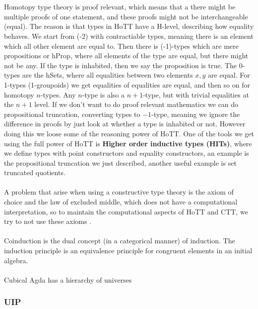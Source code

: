 \documentclass[twoside,11pt,openright]{report}
\theoremstyle{plain} %
\theoremstyle{definition}
\theoremstyle{remark}
\begin{document}
\\ \\
Homotopy type theory is proof relevant, which means that a there might be multiple proofs of one statement, and these proofs might not be interchangeable (equal). The reason is that types in HoTT have a H-level, describing how equality behaves. We start from (-2) with contractiable types, meaning there is an element which all other element are equal to. Then there is (-1)-types which are mere propositions or hProp, where all elements of the type are equal, but there might not be any. If the type is inhabited, then we say the proposition is true. The 0-types are the hSets, where all equalities between two elements \(x,y\) are equal. For 1-types (1-groupoids) we get equalities of equalities are equal, and then so on for homotopy \(n\)-types. Any \(n\)-type is also a \(n+1\)-type, but with trivial equalities at the \(n+1\) level. If we don't want to do proof relevant mathematics we can do propositional truncation, converting types to \(-1\)-type, meaning we ignore the difference in proofs by just look at whether a type is inhabited or not. However doing this we loose some of the reasoning power of HoTT. One of the tools we get using the full power of HoTT is \textbf{Higher order inductive types (HITs)}, where we define types with point constructors and equality constructors, an example is the propositional truncation we just described, another useful example is set truncated quotients.
\\ \\
A problem that arise when using a constructive type theory is the axiom of choice and the law of excluded middle, which does not have a computational interpretation, so to maintain the computational aspects of HoTT and CTT, we try to not use these axioms \cite[Introduction]{hottbook}.
\\ \\
Coinduction is the dual concept (in a categorical manner) of induction. The induction principle is an equivalence principle for congruent elements in an initial algebra.
\\ \\
Cubical Agda has a hierarchy of universes

\subsubsection{UIP}
\end{document}
